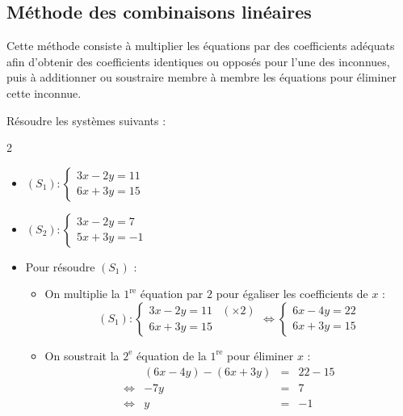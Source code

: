 \subsection{Méthode des combinaisons linéaires}

\begin{methode}
	Cette méthode consiste à multiplier les équations par des coefficients adéquats afin d'obtenir des coefficients identiques ou opposés pour l'une des inconnues, puis à additionner ou soustraire membre à membre les équations pour éliminer cette inconnue.
\end{methode}

\begin{ex}
	Résoudre les systèmes suivants :

	\begin{multicols}{2}
		\begin{itemize}
			\item $(S_1):\begin{cases} 3x - 2y = 11 \\ 6x + 3y = 15 \end{cases}$
			\item $(S_2):\begin{cases} 3x - 2y = 7 \\ 5x + 3y = -1 \end{cases}$
		\end{itemize}
	\end{multicols}

	\begin{correction}
		\nline
		\begin{itemize}
			\item Pour résoudre $(S_1)$ :
			      \begin{itemize}
				      \item On multiplie la $1^\text{re}$ équation par $2$ pour égaliser les coefficients de $x$ :
				            \[
					            (S_1):\begin{cases}
						            3x - 2y = 11 & (\times 2) \\
						            6x + 3y = 15
					            \end{cases}
					            \iff
					            \begin{cases}
						            6x - 4y = 22 \\
						            6x + 3y = 15
					            \end{cases}
				            \]

				      \item On soustrait la $2^\text{e}$ équation de la $1^\text{re}$ pour éliminer $x$ :
				            \[
					            \begin{array}{rrcl}
						                 & (6x - 4y) - (6x + 3y) & = & 22 - 15 \\
						            \iff & -7y                   & = & 7       \\
						            \iff & y                     & = & -1
					            \end{array}
				            \]


\end{itemize}
\end{itemize}
\end{correction}
\end{ex}
